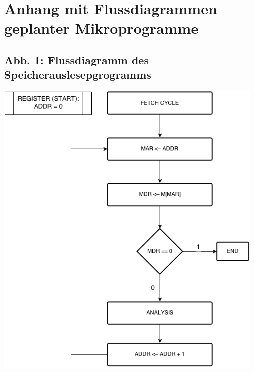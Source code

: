 \documentclass[12pt,titlepage]{article}
\begin{document}
\section{Anhang mit Flussdiagrammen \\ geplanter Mikroprogramme}

\subsection{Abb. 1: Flussdiagramm des Speicherauslesepgrogramms}
\includegraphics[width=13cm]{readFromMemory.png}
\end{document}
